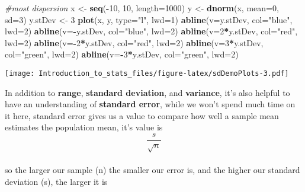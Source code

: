 \documentclass[
]{article}
\newenvironment{Shaded}{\begin{snugshade}}{\end{snugshade}}
\newcommand{\CommentTok}[1]{\textcolor[rgb]{0.56,0.35,0.01}{\textit{#1}}}
\newcommand{\DataTypeTok}[1]{\textcolor[rgb]{0.13,0.29,0.53}{#1}}
\newcommand{\DecValTok}[1]{\textcolor[rgb]{0.00,0.00,0.81}{#1}}
\newcommand{\KeywordTok}[1]{\textcolor[rgb]{0.13,0.29,0.53}{\textbf{#1}}}
\newcommand{\NormalTok}[1]{#1}
\newcommand{\OperatorTok}[1]{\textcolor[rgb]{0.81,0.36,0.00}{\textbf{#1}}}
\newcommand{\StringTok}[1]{\textcolor[rgb]{0.31,0.60,0.02}{#1}}
\begin{document}
\begin{Shaded}
\begin{Highlighting}[]
\CommentTok{\#most dispersion}
\NormalTok{x \textless{}{-}}\StringTok{ }\KeywordTok{seq}\NormalTok{(}\OperatorTok{{-}}\DecValTok{10}\NormalTok{, }\DecValTok{10}\NormalTok{, }\DataTypeTok{length=}\DecValTok{1000}\NormalTok{)}
\NormalTok{y \textless{}{-}}\StringTok{ }\KeywordTok{dnorm}\NormalTok{(x, }\DataTypeTok{mean=}\DecValTok{0}\NormalTok{, }\DataTypeTok{sd=}\DecValTok{3}\NormalTok{)}
\NormalTok{y.stDev \textless{}{-}}\StringTok{ }\DecValTok{3}
\KeywordTok{plot}\NormalTok{(x, y, }\DataTypeTok{type=}\StringTok{"l"}\NormalTok{, }\DataTypeTok{lwd=}\DecValTok{1}\NormalTok{)}
\KeywordTok{abline}\NormalTok{(}\DataTypeTok{v=}\NormalTok{y.stDev, }\DataTypeTok{col=}\StringTok{"blue"}\NormalTok{, }\DataTypeTok{lwd=}\DecValTok{2}\NormalTok{)}
\KeywordTok{abline}\NormalTok{(}\DataTypeTok{v=}\OperatorTok{{-}}\NormalTok{y.stDev, }\DataTypeTok{col=}\StringTok{"blue"}\NormalTok{, }\DataTypeTok{lwd=}\DecValTok{2}\NormalTok{)}
\KeywordTok{abline}\NormalTok{(}\DataTypeTok{v=}\DecValTok{2}\OperatorTok{*}\NormalTok{y.stDev, }\DataTypeTok{col=}\StringTok{"red"}\NormalTok{, }\DataTypeTok{lwd=}\DecValTok{2}\NormalTok{)}
\KeywordTok{abline}\NormalTok{(}\DataTypeTok{v=}\OperatorTok{{-}}\DecValTok{2}\OperatorTok{*}\NormalTok{y.stDev, }\DataTypeTok{col=}\StringTok{"red"}\NormalTok{, }\DataTypeTok{lwd=}\DecValTok{2}\NormalTok{)}
\KeywordTok{abline}\NormalTok{(}\DataTypeTok{v=}\DecValTok{3}\OperatorTok{*}\NormalTok{y.stDev, }\DataTypeTok{col=}\StringTok{"green"}\NormalTok{, }\DataTypeTok{lwd=}\DecValTok{2}\NormalTok{)}
\KeywordTok{abline}\NormalTok{(}\DataTypeTok{v=}\OperatorTok{{-}}\DecValTok{3}\OperatorTok{*}\NormalTok{y.stDev, }\DataTypeTok{col=}\StringTok{"green"}\NormalTok{, }\DataTypeTok{lwd=}\DecValTok{2}\NormalTok{)}
\end{Highlighting}
\end{Shaded}

\texttt{[image: Introduction\_to\_stats\_files/figure-latex/sdDemoPlots-3.pdf]}

In addition to \textbf{range}, \textbf{standard deviation}, and
\textbf{variance}, it's also helpful to have an understanding of
\textbf{standard error}, while we won't spend much time on it here,
standard error gives us a value to compare how well a sample mean
estimates the population mean, it's value is \[\frac{s}{\sqrt{n}}\]\\
so the larger our sample (n) the smaller our error is, and the higher
our standard deviation (s), the larger it is
\end{document}
